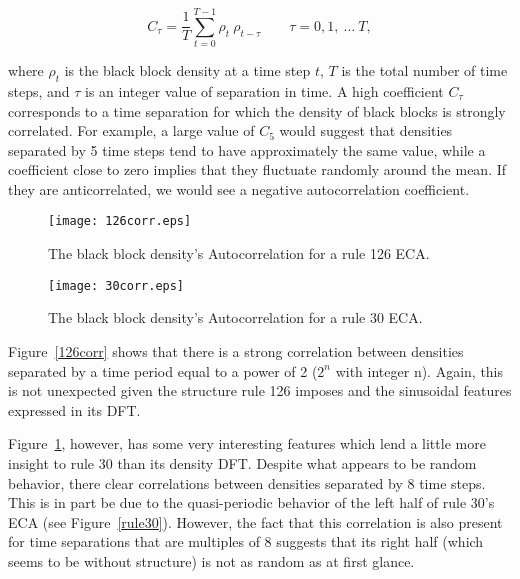 \begin{equation}
    C_\tau = \frac{1}{T}\sum_{t=0}^{T-1} \rho_t \ \rho_{t-\tau} \qquad
    \tau = 0, 1,\ \ldots\ T,
\end{equation}

\noindent where $\rho_t$ is the black block density at a time step
$t$, $T$ is the total number of time steps, and $\tau$ is an integer
value of separation in time.
A high coefficient $C_\tau$ corresponds to a time separation for which
the density of black blocks is strongly correlated.
For example, a large value of $C_5$ would suggest that densities
separated by 5 time steps tend to have approximately the same value,
while a coefficient close to zero implies that they fluctuate randomly
around the mean.
If they are anticorrelated, we would see a negative autocorrelation
coefficient.

\begin{figure}
    \begin{minipage}[b]{0.49\textwidth}
        \centering
        \texttt{[image: 126corr.eps]}
        \caption{\label{126corr} The black block density's
        Autocorrelation for a rule 126 ECA.}
    \end{minipage}
    \hspace{0.5cm}
    \begin{minipage}[b]{0.49\textwidth}
        \centering
        \texttt{[image: 30corr.eps]}
        \caption{\label{30corr} The black block density's
        Autocorrelation for a rule 30 ECA.}
    \end{minipage}
\end{figure}

Figure~\ref{126corr} shows that there is a strong correlation between
densities separated by a time period equal to a power of 2 ($2^n$
with integer n).
Again, this is not unexpected given the structure rule 126 imposes and
the sinusoidal features expressed in its DFT.

Figure~\ref{30corr}, however, has some very interesting features which
lend a little more insight to rule 30 than its density DFT.
Despite what appears to be random behavior, there clear correlations
between densities separated by 8 time steps.
This is in part be due to the quasi-periodic behavior of the left
half of rule 30's ECA (see Figure~\ref{rule30}).
However, the fact that this correlation is also present for time
separations that are multiples of 8 suggests that its right half
(which seems to be without structure) is not as random as at first
glance.
